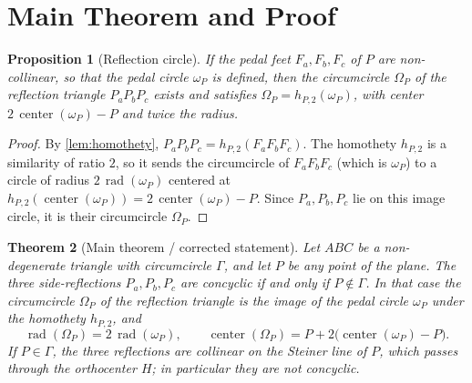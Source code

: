 \documentclass[11pt,a4paper]{article}
\newtheorem{theorem}{Theorem}[section]
\newtheorem{proposition}[theorem]{Proposition}
\theoremstyle{definition}
\newcommand{\Pa}{P_{a}}
\newcommand{\Pb}{P_{b}}
\newcommand{\Pc}{P_{c}}
\newcommand{\Fa}{F_{a}}
\newcommand{\Fb}{F_{b}}
\newcommand{\Fc}{F_{c}}
\newcommand{\circc}{\Gamma}
\newcommand{\pedalc}{\omega_{P}}
\newcommand{\reflc}{\Omega_{P}}
\begin{document}
\section{Main Theorem and Proof}\label{sec:main}

\begin{proposition}[Reflection circle]\label{prop:reflcirc}
If the pedal feet $\Fa,\Fb,\Fc$ of $P$ are non-collinear, so that the pedal circle $\pedalc$ is defined, then the circumcircle $\reflc$ of the reflection triangle $\Pa\Pb\Pc$ exists and satisfies $\reflc=h_{P,2}(\pedalc)$, with center $2\,\operatorname{center}(\pedalc)-P$ and twice the radius.
\end{proposition}
\begin{proof}
By \cref{lem:homothety}, $\Pa\Pb\Pc=h_{P,2}(\Fa\Fb\Fc)$. The homothety $h_{P,2}$ is a similarity of ratio $2$, so it sends the circumcircle of $\Fa\Fb\Fc$ (which is $\pedalc$) to a circle of radius $2\,\operatorname{rad}(\pedalc)$ centered at $h_{P,2}(\operatorname{center}(\pedalc))=2\,\operatorname{center}(\pedalc)-P$. Since $\Pa,\Pb,\Pc$ lie on this image circle, it is their circumcircle $\reflc$.
\end{proof}

\begin{theorem}[Main theorem / corrected statement]\label{thm:main}
Let $ABC$ be a non-degenerate triangle with circumcircle $\circc$, and let $P$ be any point of the plane. The three side-reflections $\Pa,\Pb,\Pc$ are concyclic if and only if $P\notin\circc$. In that case the circumcircle $\reflc$ of the reflection triangle is the image of the pedal circle $\pedalc$ under the homothety $h_{P,2}$, and
\begin{equation}\label{eq:radius}
\operatorname{rad}(\reflc)=2\,\operatorname{rad}(\pedalc),\qquad
\operatorname{center}(\reflc)=P+2\bigl(\operatorname{center}(\pedalc)-P\bigr).
\end{equation}
If $P\in\circc$, the three reflections are collinear on the Steiner line of $P$, which passes through the orthocenter $H$; in particular they are not concyclic.
\end{theorem}
\end{document}
